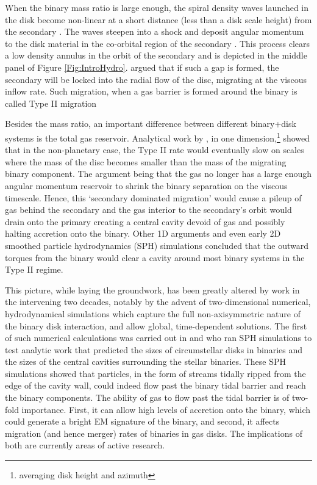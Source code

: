 When the binary mass ratio is large enough, the spiral density waves launched
in the disk become non-linear at a short distance (less than a disk scale
height) from the secondary \citep{GoodmanRafikov:2001}. The waves steepen into
a shock and deposit angular momentum to the disk material in the co-orbital
region of the secondary \citep[see Chapter \ref{ch:CBDTrans} and also][]{DongRafI:2011, DongRafII:2011, LinPapaI:1984,LinPapa86b,
LinPapaIII:1986}. This process clears a low density annulus in the orbit of
the secondary and is depicted in the middle panel of Figure
\ref{Fig:IntroHydro}. \cite{LinPapa86b} argued that if
such a gap is formed, the secondary will be locked into the radial flow of the
disc, migrating at the viscous inflow rate. Such migration, when a gas barrier
is formed around the binary is called Type II migration \citep[see also][and Chapter \ref{ch:CBDTrans}]{Ward:1997, KleyNelson:2012:rev}



Besides the mass ratio, an important difference between different binary+disk systems is the
total gas reservoir. Analytical work by \citep{SyerClarke95, Ivanov99}, in
one dimension,\footnote{averaging disk height and azimuth} showed that in the
non-planetary case, the Type II rate would eventually slow on scales where the
mass of the disc becomes smaller than the mass of the migrating binary
component. The argument being that the gas no longer has a large enough angular
momentum reservoir to shrink the binary separation on the viscous
timescale. Hence, this `secondary dominated migration' would cause a pileup of
gas behind the secondary and the gas interior to the secondary's orbit would
drain onto the primary creating a central cavity devoid of gas and possibly
halting accretion onto the binary. Other 1D arguments
\citep[][]{Milos:Phinney:2005} and even early 2D smoothed particle hydrodynamics
(SPH) simulations \citep{Artymowicz:1991} concluded that the outward torques
from the binary would clear a cavity around most binary systems in the Type II
regime.


This picture, while laying the groundwork, has been greatly altered by work in
the intervening two decades, notably by the advent of two-dimensional
numerical, hydrodynamical simulations which capture the full non-axisymmetric
nature of the binary disk interaction, and allow global, time-dependent
solutions. The first of such numerical calculations was carried out in
\cite{AL94} and \cite{ArtyLubow:1996} who ran SPH simulations to
test analytic work that predicted the sizes of circumstellar disks in binaries
and the sizes of the central cavities surrounding the stellar binaries. These
SPH simulations showed that particles, in the form of streams tidally ripped
from the edge of the cavity wall, could indeed flow past the binary tidal
barrier and reach the binary components. The ability of gas to flow past the
tidal barrier is of two-fold importance. First, it can allow high levels of
accretion onto the binary, which could generate a bright EM signature of the
binary, and second, it affects migration (and hence merger) rates of binaries
in gas disks. The implications of both are currently areas
of active research. 




